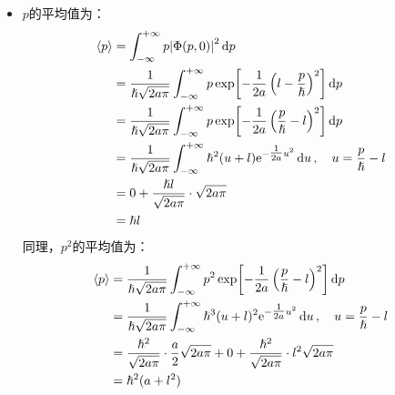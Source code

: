 \documentclass[a4paper,fontset=none]{ctexart}
\renewcommand\hbar\hslash
\begin{document}
\begin{itemize}
\begin{align*}
            &= K \frac{\gamma\sqrt{\pi}}{\sqrt{a}} \exp[-\frac{a}{\gamma^2} \left(\frac{hlt}{m}\right)^2 + il \frac{hlt}{2m}] \exp[-\frac{\gamma^2}{4a}\left(l - \frac{p}{\hbar}\right)^2 - i\left(l - \frac{p}{\hbar}\right)\left(\frac{hlt}{m}\right) + \frac{a}{\gamma^2}\left(\frac{hlt}{m}\right)^2] \\
            &= \frac{1}{\sqrt{2a\hbar}} \sqrt[4]{\frac{2a}{\pi}} \exp[-\frac{\gamma^2}{4a} \left(l - \frac{p}{\hbar}\right)^2 - \frac{ihlt}{2m} \left(l - \frac{2p}{\hbar}\right)]
        \end{align*}
        注意到$\gamma^2 = 1 + i\theta = 1 + i\theta(t)$，$t = 0$时$\gamma^2 = 1$，且$\gamma^2 + \left(\gamma^2\right)^* = 2\Re\left(\gamma^2\right) = 2$，于是有：
        \[
            \abs{\Phi(p,0)}^2 = \abs{\Phi(p,t)}^2 = \frac{1}{\hbar\sqrt{2a\pi}} \exp[-\frac{1}{2a}\left(l-\frac{p}{\hbar}\right)^2]
        \]
        可见$\abs{\Phi(p,t)}^2$与时间无关。

        \item[49.(c)]
        $p$的平均值为：
        \begin{align*}
            \expval{p}
            &= \int_{-\infty}^{+\infty} p \abs{\Phi(p,0)}^2 \dd{p} \\
            &= \frac{1}{\hbar\sqrt{2a\pi}} \int_{-\infty}^{+\infty} p \exp[-\frac{1}{2a}\left(l-\frac{p}{\hbar}\right)^2] \dd{p} \\
            &= \frac{1}{\hbar\sqrt{2a\pi}} \int_{-\infty}^{+\infty} p \exp[-\frac{1}{2a}\left(\frac{p}{\hbar}-l\right)^2] \dd{p} \\
            &= \frac{1}{\hbar\sqrt{2a\pi}} \int_{-\infty}^{+\infty} \hbar^2 (u + l) \mathrm{e}^{-\tfrac{1}{2a} u^2} \dd{u},\quad u = \frac{p}{\hbar} - l \\
            &= 0 + \frac{\hbar l}{\sqrt{2a\pi}} \cdot \sqrt{2a\pi} \\
            &= \hbar l
        \end{align*}
        同理，$p^2$的平均值为：
        \begin{align*}
            \expval{p}
            &= \frac{1}{\hbar\sqrt{2a\pi}} \int_{-\infty}^{+\infty} p^2 \exp[-\frac{1}{2a}\left(\frac{p}{\hbar}-l\right)^2] \dd{p} \\
            &= \frac{1}{\hbar\sqrt{2a\pi}} \int_{-\infty}^{+\infty} \hbar^3 (u + l)^2 \mathrm{e}^{-\tfrac{1}{2a} u^2} \dd{u},\quad u = \frac{p}{\hbar} - l \\
            &= \frac{\hbar^2}{\sqrt{2a\pi}} \cdot \frac{a}{2}\sqrt{2a\pi} + 0 + \frac{\hbar^2}{\sqrt{2a\pi}} \cdot l^2\sqrt{2a\pi} \\
            &= \hbar^2 (a + l^2)
        \end{align*}


\end{itemize}
\end{document}
